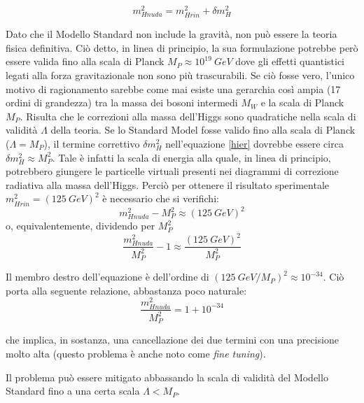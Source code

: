 \begin{equation}
\label{hier}
 m^{2}_{Hnuda}=m^{2}_{Hrin}+\delta m^{2}_{H}
\end{equation}

\bigskip
Dato che il Modello Standard non include la gravità, non può essere la teoria fisica definitiva.
\newline
Ciò detto, in linea di principio, la sua formulazione potrebbe però essere valida fino alla scala di Planck $M_{P} \approx 10^{19} ~GeV$ 
dove gli effetti quantistici legati alla forza gravitazionale non sono più trascurabili.
\newline
Se ciò fosse vero, l'unico motivo di ragionamento sarebbe come mai esiste una gerarchia così ampia (17 ordini di grandezza)
tra la massa dei bosoni intermedi $M_{W}$ e la scala di Planck $M_{P}$.
\newline
Risulta che le correzioni alla massa dell'Higgs sono quadratiche nella scala di validità $\Lambda$ della teoria.
Se lo Standard Model fosse valido fino alla scala di Planck ($\Lambda=M_P$), il termine correttivo $\delta m^{2}_{H}$ nell'equazione \ref{hier} 
dovrebbe essere circa $\delta m^{2}_{H}\approx M^{2}_{P}$. Tale è infatti la scala di energia alla quale, 
in linea di principio, potrebbero giungere le particelle virtuali presenti nei diagrammi di correzione radiativa alla massa dell'Higgs.
\newline
Perciò per ottenere il risultato sperimentale $m^{2}_{Hrin}=(125 ~GeV)^{2}$ è necessario che si verifichi:
\begin{equation}
 m^{2}_{Hnuda} -M^{2}_{P}\approx (125 ~GeV)^{2}
\end{equation}
o, equivalentemente, dividendo per $M^{2}_{P}$
\begin{equation}
 \dfrac{m^{2}_{Hnuda}}{M^{2}_{P}} -1\approx \dfrac{(125 ~GeV)^{2}}{M^{2}_{P}}
\end{equation}

Il membro destro dell'equazione è dell'ordine di $(125 ~GeV/M_{P})^{2} \approx 10^{-34}$.
\newline
Ciò porta alla seguente relazione, abbastanza poco naturale:
\begin{equation}
 \dfrac{m^{2}_{Hnuda}}{M^{2}_{P}}=1+10^{-34}
\end{equation}

che implica, in sostanza, una cancellazione dei due termini con una precisione molto alta 
(questo problema è anche noto come \textit{fine tuning}).

\medskip
Il problema può essere mitigato abbassando la scala di validità del Modello Standard fino a una certa scala $\Lambda < M_P$.


